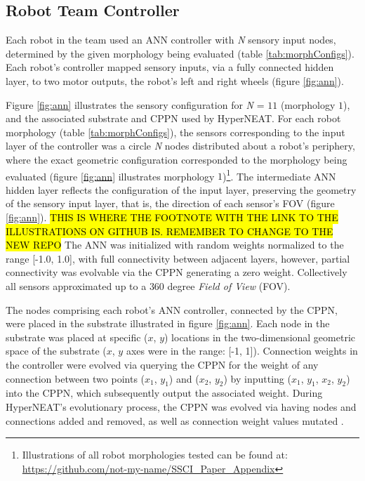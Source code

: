 \subsection{Robot Team Controller}\label{sec:embodiment}
Each robot in the team used an ANN controller with
\textit{N} sensory input nodes, determined by the given morphology being evaluated (table \ref{tab:morphConfigs}).
Each robot's controller mapped sensory inputs, via a fully connected hidden layer, to two motor outputs, the
robot's left and right wheels (figure \ref{fig:ann}). %

Figure \ref{fig:ann} illustrates the sensory configuration for \textit{N} = $11$ (morphology $1$), and the
associated substrate and CPPN used by HyperNEAT.
For each robot morphology (table \ref{tab:morphConfigs}), the sensors corresponding to the input layer
of the controller was a circle \textit{N} nodes distributed about a robot's periphery,
where the exact geometric configuration corresponded to the morphology being evaluated
(figure \ref{fig:ann} illustrates morphology
$1$)\footnote{Illustrations of all robot morphologies tested can be found at: \url{https://github.com/not-my-name/SSCI_Paper_Appendix}}.
The intermediate ANN hidden layer reflects the configuration of the input layer, preserving
the geometry of the sensory input layer, that is, the direction of each sensor's FOV (figure
\ref{fig:ann}). \hl{THIS IS WHERE THE FOOTNOTE WITH THE LINK TO THE ILLUSTRATIONS ON GITHUB IS. REMEMBER TO CHANGE TO THE NEW REPO}
The ANN was initialized with random weights normalized to the range [-1.0, 1.0], with full connectivity between adjacent layers,
however, partial connectivity was evolvable via the CPPN generating a zero weight.
Collectively all sensors approximated up to a $360$ degree \textit{Field of View} (FOV).

The nodes comprising each robot's ANN controller, connected by the CPPN, were placed in the substrate
illustrated in figure \ref{fig:ann}.
Each node in the substrate was placed at specific ($x$, $y$) locations in the two-dimensional geometric space
of the substrate ($x$, $y$ axes were in the range: [-1, 1]).
Connection weights in the controller were evolved via querying the CPPN for the weight of any connection
between two points ($x_{1}$, $y_{1}$) and ($x_{2}$, $y_{2}$) by inputting ($x_{1}$, $y_{1}$, $x_{2}$, $y_{2}$)
into the CPPN, which subsequently output the associated weight.
During HyperNEAT's evolutionary process, the CPPN was evolved via having nodes and connections added and removed, as well
as connection weight values mutated \cite{StanleyDAmbrosioGauci2009}.

